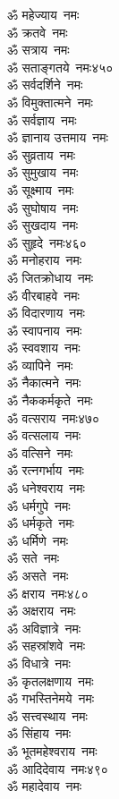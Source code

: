\begin{multicols}{2}
\begin{flushleft}
ॐ महेज्याय~नमः\\
ॐ क्रतवे~नमः\\
ॐ सत्राय~नमः\\
ॐ सताङ्गतये~नमः\hfill ४५०\\
ॐ सर्वदर्शिने~नमः\\
ॐ विमुक्तात्मने~नमः\\
ॐ सर्वज्ञाय~नमः\\
ॐ ज्ञानाय उत्तमाय~नमः\\
ॐ सुव्रताय~नमः\\
ॐ सुमुखाय~नमः\\
ॐ सूक्ष्माय~नमः\\
ॐ सुघोषाय~नमः\\
ॐ सुखदाय~नमः\\
ॐ सुहृदे~नमः\hfill ४६०\\
ॐ मनोहराय~नमः\\
ॐ जितक्रोधाय~नमः\\
ॐ वीरबाहवे~नमः\\
ॐ विदारणाय~नमः\\
ॐ स्वापनाय~नमः\\
ॐ स्ववशाय~नमः\\
ॐ व्यापिने~नमः\\
ॐ नैकात्मने~नमः\\
ॐ नैककर्मकृते~नमः\\
ॐ वत्सराय~नमः\hfill ४७०\\
ॐ वत्सलाय~नमः\\
ॐ वत्सिने~नमः\\
ॐ रत्नगर्भाय~नमः\\
ॐ धनेश्वराय~नमः\\
ॐ धर्मगुपे~नमः\\
ॐ धर्मकृते~नमः\\
ॐ धर्मिणे~नमः\\
ॐ सते~नमः\\
ॐ असते~नमः\\
ॐ क्षराय~नमः\hfill ४८०\\
ॐ अक्षराय~नमः\\
ॐ अविज्ञात्रे~नमः\\
ॐ सहस्रांशवे~नमः\\
ॐ विधात्रे~नमः\\
ॐ कृतलक्षणाय~नमः\\
ॐ गभस्तिनेमये~नमः\\
ॐ सत्त्वस्थाय~नमः\\
ॐ सिंहाय~नमः\\
ॐ भूतमहेश्वराय~नमः\\
ॐ आदिदेवाय~नमः\hfill ४९०\\
ॐ महादेवाय~नमः\\

\end{flushleft}
\end{multicols}
